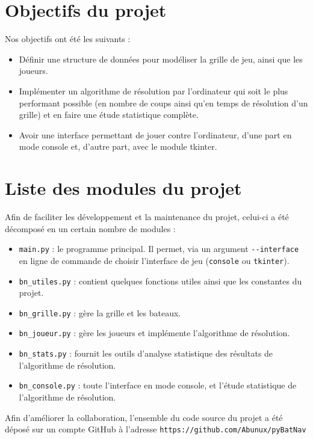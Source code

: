 \section{Objectifs du projet}
Nos objectifs ont été les suivants :
\begin{itemize}
\item Définir une structure de données pour modéliser la grille de jeu, ainsi que les joueurs.
\item Implémenter un algorithme de résolution par l'ordinateur qui soit le plus performant possible (en nombre de coups ainsi qu'en temps de résolution d'un grille) et en faire une étude statistique complète.
\item Avoir une interface permettant de jouer contre l'ordinateur, d'une part en mode console et, d'autre part, avec le module tkinter. 
\end{itemize}

\section{Liste des modules du projet}
Afin de faciliter les développement et la maintenance du projet, celui-ci a été décomposé en un certain nombre de modules :
\begin{itemize}
\item \texttt{main.py} : le programme principal. Il permet, via un argument \texttt{-\hspace*{1pt}-interface} en ligne de commande de choisir l'interface de jeu (\texttt{console} ou \texttt{tkinter}).
\item \texttt{bn\_utiles.py} : contient quelques fonctions utiles ainsi que les constantes du projet.
\item \texttt{bn\_grille.py} : gère la grille et les bateaux.
\item \texttt{bn\_joueur.py} : gère les joueurs et implémente l'algorithme de résolution.
\item \texttt{bn\_stats.py} : fournit les outils d'analyse statistique des résultats de l'algorithme de résolution.
\item \texttt{bn\_console.py} : toute l'interface en mode console, et l'étude statistique de l'algorithme de résolution.
\end{itemize}

\bigskip

Afin d'améliorer la collaboration, l'ensemble du code source du projet a été déposé sur un compte GitHub à l'adresse \texttt{https://github.com/Abunux/pyBatNav}

